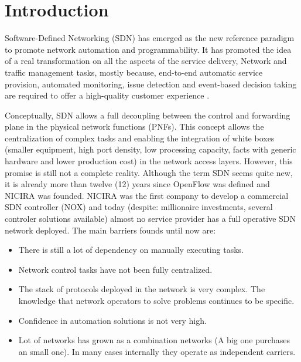 \documentclass[a4paper,fleqn]{cas-dc}
\begin{document}
\maketitle

\section{Introduction}
Software-Defined Networking (SDN) has emerged as the new reference paradigm to promote network automation and programmability. It has promoted the idea of a real transformation on all the aspects of the service delivery, Network and traffic management tasks, mostly because, end-to-end automatic service provision, automated monitoring, issue detection and event-based decision taking are required to offer a high-quality customer experience \cite{ordonez2017network,ong2017onf}.


Conceptually, SDN allows a full decoupling between the control and forwarding plane in the physical network functions (PNFs)\cite{brief2014openflow}. This concept allows the centralization of complex tasks and enabling the integration of white boxes (smaller equipment, high port density, low processing capacity, facts with generic hardware and lower production cost) in the network access layers. However, this promise is still not a complete reality. Although the term SDN seems quite new, it is already more than twelve (12) years since OpenFlow \cite{brief2014openflow} was defined and NICIRA was founded. NICIRA was the first company to develop a commercial SDN controller (NOX) \cite{gude2008nox,tavakoli2009applying} and today (despite: millionaire investments, several controler solutions available\cite{medved2014opendaylight,berde2014onos}) almost no service provider has a full operative SDN network deployed.  The main barriers founds until now are:

\begin{itemize}
    \item There is still a lot of dependency on manually executing tasks.
    \item Network control tasks have not been fully centralized.
    \item The stack of protocols deployed in the network is very complex.  The knowledge that network operators  to solve problems continues to be specific.
    \item Confidence in automation solutions is not very high.
    \item Lot of networks has grown as a combination networks (A big one purchases an small one). In many cases  internally they operate as independent carriers. 
\end{itemize}
\end{document}

